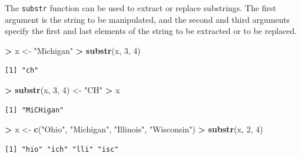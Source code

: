 \documentclass[]{krantz}
\makeatletter
\newenvironment{Shaded}{\begin{snugshade}}{\end{snugshade}}
\newcommand{\DecValTok}[1]{\textcolor[rgb]{0.06,0.06,0.06}{#1}}
\newcommand{\KeywordTok}[1]{\textcolor[rgb]{0.27,0.27,0.27}{\textbf{#1}}}
\newcommand{\NormalTok}[1]{#1}
\newcommand{\OperatorTok}[1]{\textcolor[rgb]{0.43,0.43,0.43}{\textbf{#1}}}
\newcommand{\StringTok}[1]{\textcolor[rgb]{0.5,0.5,0.5}{#1}}
\newenvironment{kframe}{%
\medskip{}
\setlength{\fboxsep}{.8em}
 \def\at@end@of@kframe{}%
 \ifinner\ifhmode%
  \def\at@end@of@kframe{\end{minipage}}%
  \begin{minipage}{\columnwidth}%
 \fi\fi%
 \def\FrameCommand##1{\hskip\@totalleftmargin \hskip-\fboxsep
 \colorbox{shadecolor}{##1}\hskip-\fboxsep
     \hskip-\linewidth \hskip-\@totalleftmargin \hskip\columnwidth}%
 \MakeFramed {\advance\hsize-\width
   \@totalleftmargin\z@ \linewidth\hsize
   \@setminipage}}%
 {\par\unskip\endMakeFramed%
 \at@end@of@kframe}
\renewenvironment{Shaded}{\begin{kframe}}{\end{kframe}}
\makeatother
\begin{document}
The \texttt{substr} function can be used to extract or replace substrings. The first argument is the string to be manipulated, and the second and third arguments specify the first and last elements of the string to be extracted or to be replaced.

\begin{Shaded}
\begin{Highlighting}[]
\OperatorTok{>}\StringTok{ }\NormalTok{x <-}\StringTok{ "Michigan"}
\OperatorTok{>}\StringTok{ }\KeywordTok{substr}\NormalTok{(x, }\DecValTok{3}\NormalTok{, }\DecValTok{4}\NormalTok{)}
\end{Highlighting}
\end{Shaded}

\begin{verbatim}
[1] "ch"
\end{verbatim}

\begin{Shaded}
\begin{Highlighting}[]
\OperatorTok{>}\StringTok{ }\KeywordTok{substr}\NormalTok{(x, }\DecValTok{3}\NormalTok{, }\DecValTok{4}\NormalTok{) <-}\StringTok{ "CH"}
\OperatorTok{>}\StringTok{ }\NormalTok{x}
\end{Highlighting}
\end{Shaded}

\begin{verbatim}
[1] "MiCHigan"
\end{verbatim}

\begin{Shaded}
\begin{Highlighting}[]
\OperatorTok{>}\StringTok{ }\NormalTok{x <-}\StringTok{ }\KeywordTok{c}\NormalTok{(}\StringTok{"Ohio"}\NormalTok{, }\StringTok{"Michigan"}\NormalTok{, }\StringTok{"Illinois"}\NormalTok{, }\StringTok{"Wisconsin"}\NormalTok{)}
\OperatorTok{>}\StringTok{ }\KeywordTok{substr}\NormalTok{(x, }\DecValTok{2}\NormalTok{, }\DecValTok{4}\NormalTok{)}
\end{Highlighting}
\end{Shaded}

\begin{verbatim}
[1] "hio" "ich" "lli" "isc"
\end{verbatim}

\begin{Shaded}
\end{Shaded}
\end{document}
